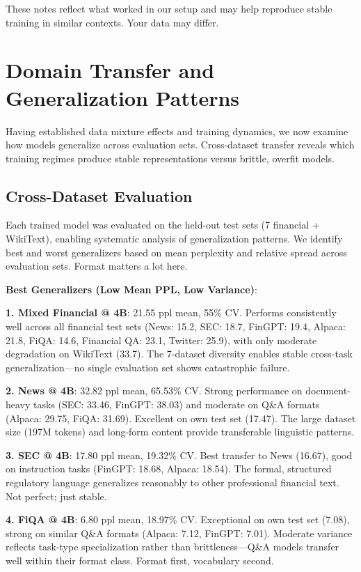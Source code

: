 These notes reflect what worked in our setup and may help reproduce stable training in similar contexts. Your data may differ.

\section{Domain Transfer and Generalization Patterns}

Having established data mixture effects and training dynamics, we now examine how models generalize across evaluation sets. Cross-dataset transfer reveals which training regimes produce stable representations versus brittle, overfit models.

\subsection{Cross-Dataset Evaluation}

Each trained model was evaluated on the held-out test sets (7 financial + WikiText), enabling systematic analysis of generalization patterns. We identify best and worst generalizers based on mean perplexity and relative spread across evaluation sets. Format matters a lot here.

\textbf{Best Generalizers (Low Mean PPL, Low Variance)}:

\textbf{1. Mixed Financial @ 4B}: 21.55 ppl mean, 55\% CV. Performs consistently well across all financial test sets (News: 15.2, SEC: 18.7, FinGPT: 19.4, Alpaca: 21.8, FiQA: 14.6, Financial QA: 23.1, Twitter: 25.9), with only moderate degradation on WikiText (33.7). The 7-dataset diversity enables stable cross-task generalization—no single evaluation set shows catastrophic failure.

\textbf{2. News @ 4B}: 32.82 ppl mean, 65.53\% CV. Strong performance on document-heavy tasks (SEC: 33.46, FinGPT: 38.03) and moderate on Q\&A formats (Alpaca: 29.75, FiQA: 31.69). Excellent on own test set (17.47). The large dataset size (197M tokens) and long-form content provide transferable linguistic patterns.

\textbf{3. SEC @ 4B}: 17.80 ppl mean, 19.32\% CV. Best transfer to News (16.67), good on instruction tasks (FinGPT: 18.68, Alpaca: 18.54). The formal, structured regulatory language generalizes reasonably to other professional financial text. Not perfect; just stable.

\textbf{4. FiQA @ 4B}: 6.80 ppl mean, 18.97\% CV. Exceptional on own test set (7.08), strong on similar Q\&A formats (Alpaca: 7.12, FinGPT: 7.01). Moderate variance reflects task-type specialization rather than brittleness—Q\&A models transfer well within their format class. Format first, vocabulary second.

